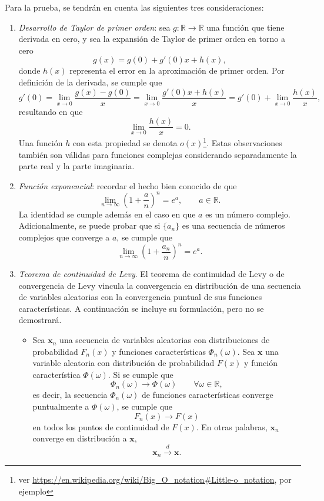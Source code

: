 \documentclass[a4paper]{report}
\newcommand{\x}{\mathbf{x}}
\begin{document}
Para la prueba, se tendrán en cuenta las siguientes tres consideraciones:
\begin{enumerate}
 \item \emph{Desarrollo de Taylor de primer orden}: sea \(g:\mathbb{R}\to\mathbb{R}\) una función que tiene derivada en cero, y sea la expansión de Taylor de primer orden en torno a cero
 \[
  g(x)=g(0)+g'(0)x+h(x),
 \]
 donde \(h(x)\) representa el error en la aproximación de primer orden. Por definición de la derivada, se cumple que
 \[
  g'(0)=\lim_{x\to0}\frac{g(x)-g(0)}{x}=\lim_{x\to0}\frac{g'(0)x+h(x)}{x}=g'(0)+\lim_{x\to0}\frac{h(x)}{x},
 \]
 resultando en que
 \[
  \lim_{x\to0}\frac{h(x)}{x}=0.
 \]
 Una función \(h\) con esta propiedad se denota \(o(x)\)\footnote{ver \url{https://en.wikipedia.org/wiki/Big_O_notation\#Little-o_notation}, por ejemplo}. Estas observaciones también son válidas para funciones complejas considerando separadamente la parte real y la parte imaginaria.
 \item \emph{Función exponencial}: recordar el hecho bien conocido de que
 \[
  \lim_{n\to\infty}\left(1+\frac{a}{n}\right)^n=e^a,\qquad a\in\mathbb{R}.
 \]
 La identidad se cumple además en el caso en que \(a\) es un número complejo. Adicionalmente, se puede probar que si \(\{a_n\}\) es una secuencia de números complejos que converge a \(a\), se cumple que
 \[
  \lim_{n\to\infty}\left(1+\frac{a_n}{n}\right)^n=e^a.
 \]
 \item \emph{Teorema de continuidad de Levy}. El teorema de continuidad de Levy o de convergencia de Levy vincula la convergencia en distribución de una secuencia de variables aleatorias con la convergencia puntual de sus funciones características. A continuación se incluye su formulación, pero no se demostrará.
 \begin{itemize}
  \item[] Sea \(\x_n\) una secuencia de variables aleatorias con distribuciones de probabilidad \(F_n(x)\) y funciones características \(\Phi_n(\omega)\). Sea \(\x\) una variable aleatoria con distribución de probabilidad \(F(x)\) y función característica \(\Phi(\omega)\). Si se cumple que
  \[
   \Phi_n(\omega)\to\Phi(\omega)\qquad\forall \omega\in\mathbb{R},
  \]
  es decir, la secuencia \(\Phi_n(\omega)\) de funciones características converge puntualmente a \(\Phi(\omega)\), se cumple que 
  \[
   F_n(x)\to F(x)
  \]
 en todos los puntos de continuidad de \(F(x)\). En otras palabras, \(\x_n\) converge en distribución a \(\x\),
 \[
  \x_n\overset{d}{\to}\x.
 \]
 \end{itemize}
\end{enumerate}
\end{document}
